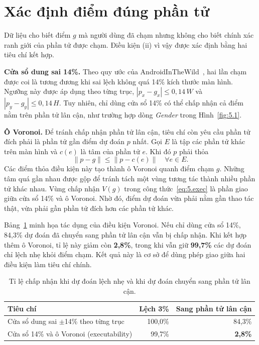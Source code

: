 \section{Xác định điểm đúng phần tử}\label{sec:5.2}

Dữ liệu cho biết điểm $g$ mà người dùng đã chạm nhưng không cho biết chính xác ranh giới của phần tử được chạm. Điều kiện (ii) vì vậy được xác định bằng hai tiêu chí kết hợp.

\textbf{Cửa sổ dung sai 14\%.} Theo quy ước của AndroidInTheWild~\cite{aitw}, hai lần chạm được coi là tương đương khi sai lệch không quá 14\% kích thước màn hình. Ngưỡng này được áp dụng theo từng trục, $|p_x-g_x| \le 0{,}14\,W$ và $|p_y-g_y| \le 0{,}14\,H$. Tuy nhiên, chỉ dùng cửa sổ 14\% có thể chấp nhận cả điểm nằm trên phần tử lân cận, như trường hợp dòng \emph{Gender} trong Hình~\ref{fig:5.1}.

\textbf{Ô Voronoi.} Để tránh chấp nhận phần tử lân cận, tiêu chí còn yêu cầu phần tử đích phải là phần tử gần điểm dự đoán $p$ nhất. Gọi $E$ là tập các phần tử khác trên màn hình và $c(e)$ là tâm của phần tử $e$. Khi đó $p$ phải thỏa
\begin{equation}
\|p-g\| \le \|p-c(e)\| \quad \forall e \in E.
\label{eq:5.1}
\end{equation}
\noindent Các điểm thỏa điều kiện này tạo thành ô Voronoi quanh điểm chạm $g$. Những tâm quá gần nhau được gộp để tránh tách một vùng tương tác thành nhiều phần tử khác nhau. Vùng chấp nhận $V(g)$ trong công thức~\eqref{eq:5.exec} là phần giao giữa cửa sổ 14\% và ô Voronoi. Nhờ đó, điểm dự đoán vừa phải nằm gần thao tác thật, vừa phải gần phần tử đích hơn các phần tử khác.

Bảng~\ref{tab:5.1} minh họa tác dụng của điều kiện Voronoi. Nếu chỉ dùng cửa sổ 14\%, 84,3\% dự đoán đã chuyển sang phần tử lân cận vẫn bị chấp nhận. Khi kết hợp thêm ô Voronoi, tỉ lệ này giảm còn \textbf{2,8\%}, trong khi vẫn giữ \textbf{99,7\%} các dự đoán chỉ lệch nhẹ khỏi điểm chạm. Kết quả này là cơ sở để dùng phép giao giữa hai điều kiện làm tiêu chí chính.

\begin{table}[htbp]
\centering\small
\caption{Tỉ lệ chấp nhận khi dự đoán lệch nhẹ và khi dự đoán chuyển sang phần tử lân cận.}\label{tab:5.1}
\begin{tabular}{@{}lrr@{}}
\toprule
\textbf{Tiêu chí} & \textbf{Lệch 3\%} & \textbf{Sang phần tử lân cận} \\
\midrule
Cửa sổ dung sai $\pm$14\% theo từng trục & 100,0\% & 84,3\% \\
Cửa sổ 14\% và ô Voronoi (executability) & 99,7\% & \textbf{2,8\%} \\
\bottomrule
\end{tabular}
\end{table}

